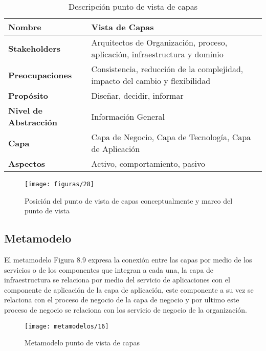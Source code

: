   \begin{table}[H]
  	\centering
   	\begin{tabular}{p{3.7cm}p{8cm}}
   		\hline
   		\rowcolor[HTML]{0073a1}
   		{\color[HTML]{FFFFFF} \textbf{Nombre}} & {\color[HTML]{FFFFFF} \textbf{Vista de Capas}} \\
   		\hline
   		\textbf{Stakeholders} & Arquitectos de Organización, proceso, aplicación, infraestructura y dominio \\
   		\textbf{Preocupaciones} & Consistencia, reducción de la complejidad, impacto del cambio y flexibilidad \\
   		\textbf{Propósito} & Diseñar, decidir, informar \\
   		\textbf{Nivel de Abstracción} & Información General \\
   		\textbf{Capa} & Capa de Negocio, Capa de Tecnología, Capa de Aplicación \\
   		\textbf{Aspectos} & Activo, comportamiento, pasivo \\
   		\bottomrule
   	\end{tabular}
   	\captionsetup{width=.95\textwidth}
   	\caption{Descripción punto de vista de capas}
   	\label{tabla19}
  \end{table}
    
  \begin{figure}[H]
   	\centering
   	\texttt{[image: figuras/28]}
   	\captionsetup{width=.95\textwidth}
   	\caption{Posición del punto de vista de capas conceptualmente y marco del punto de vista}
   	\label{figura28}
   \end{figure}
   
   \subsection{Metamodelo}
   El metamodelo Figura 8.9 expresa la conexión entre las capas por medio de los servicios o de los componentes que integran a cada una, la capa de infraestructura se relaciona por medio del servicio de aplicaciones con el componente de aplicación de la capa de aplicación, este componente a su vez se relaciona con el proceso de negocio de la capa de negocio y por ultimo este proceso de negocio se relaciona con los servicio de negocio de la organización.
  
   \begin{figure}[H]
   	\centering
   	\texttt{[image: metamodelos/16]}
   	\captionsetup{width=.95\textwidth}
   	\caption{Metamodelo punto de vista de capas}
   	\label{metamodelo16}
   \end{figure}
   
